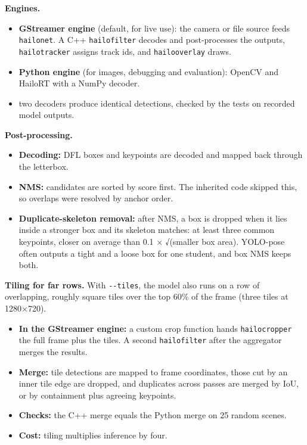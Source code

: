 \textbf{Engines.}

\begin{itemize}
\tightlist
\item
  \textbf{GStreamer engine} (default, for live use): the camera or file source feeds \texttt{hailonet}. A C++ \texttt{hailofilter} decodes and post-processes the outputs, \texttt{hailotracker} assigns track ids, and \texttt{hailooverlay} draws.
\item
  \textbf{Python engine} (for images, debugging and evaluation): OpenCV and HailoRT with a NumPy decoder.
\item two decoders produce identical detections, checked by the tests on recorded model outputs.
\end{itemize}

\textbf{Post-processing.}

\begin{itemize}
\tightlist
\item
  \textbf{Decoding:} DFL boxes and keypoints are decoded and mapped back through the letterbox.
\item
  \textbf{NMS:} candidates are sorted by score first. The inherited code skipped this, so overlaps were resolved by anchor order.
\item
  \textbf{Duplicate-skeleton removal:} after NMS, a box is dropped when it lies inside a stronger box and its skeleton matches: at least three common keypoints, closer on average than 0.1 × √(smaller box area). YOLO-pose often outputs a tight and a loose box for one student, and box NMS keeps both.
\end{itemize}

\textbf{Tiling for far rows.} With \texttt{-\/-tiles}, the model also runs on a row of overlapping, roughly square tiles over the top 60\% of the frame (three tiles at 1280×720).

\begin{itemize}
\tightlist
\item
  \textbf{In the GStreamer engine:} a custom crop function hands \texttt{hailocropper} the full frame plus the tiles. A second \texttt{hailofilter} after the aggregator merges the results.
\item
  \textbf{Merge:} tile detections are mapped to frame coordinates, those cut by an inner tile edge are dropped, and duplicates across passes are merged by IoU, or by containment plus agreeing keypoints.
\item
  \textbf{Checks:} the C++ merge equals the Python merge on 25 random scenes.
\item
  \textbf{Cost:} tiling multiplies inference by four.
\end{itemize}

